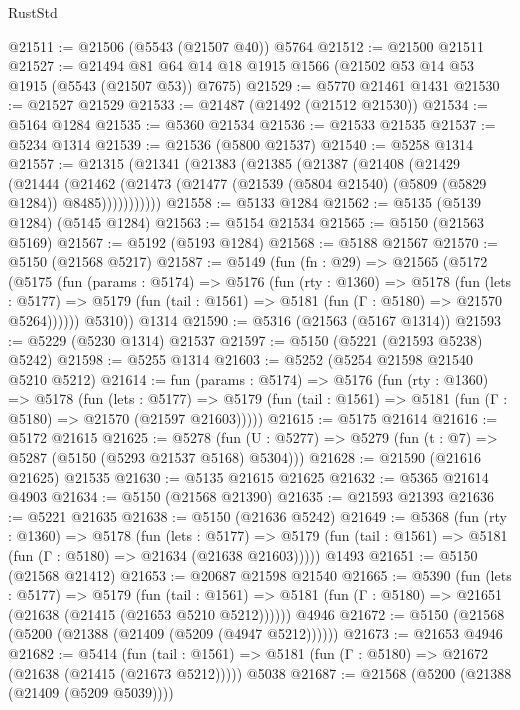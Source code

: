 \begin{lexlean}{RustStd}
\begin{coremodule}
@21511 := @21506 (@5543 (@21507 @40)) @5764
@21512 := @21500 @21511
@21527 := @21494 @81 @64 @14 @18 @1915 @1566 (@21502 @53 @14 @53 @1915 (@5543 (@21507 @53)) @7675)
@21529 := @5770 @21461 @1431
@21530 := @21527 @21529
@21533 := @21487 (@21492 (@21512 @21530))
@21534 := @5164 @1284
@21535 := @5360 @21534
@21536 := @21533 @21535
@21537 := @5234 @1314
@21539 := @21536 (@5800 @21537)
@21540 := @5258 @1314
@21557 := @21315
    (@21341
      (@21383
        (@21385
          (@21387
            (@21408
              (@21429
                (@21444
                  (@21462
                    (@21473 (@21477 (@21539 (@5804 @21540) (@5809 (@5829 @1284)) @8485)))))))))))
@21558 := @5133 @1284
@21562 := @5135 (@5139 @1284) (@5145 @1284)
@21563 := @5154 @21534
@21565 := @5150 (@21563 @5169)
@21567 := @5192 (@5193 @1284)
@21568 := @5188 @21567
@21570 := @5150 (@21568 @5217)
@21587 := @5149
    (fun (fn : @29) =>
    @21565
      (@5172
        (@5175
          (fun (params : @5174) =>
          @5176
            (fun (rty : @1360) =>
            @5178
              (fun (lets : @5177) =>
              @5179 (fun (tail : @1561) => @5181 (fun (Γ : @5180) => @21570 @5264))))))
        @5310))
    @1314
@21590 := @5316 (@21563 (@5167 @1314))
@21593 := @5229 (@5230 @1314) @21537
@21597 := @5150 (@5221 (@21593 @5238) @5242)
@21598 := @5255 @1314
@21603 := @5252 (@5254 @21598 @21540 @5210 @5212)
@21614 := fun (params : @5174) =>
  @5176
    (fun (rty : @1360) =>
    @5178
      (fun (lets : @5177) =>
      @5179 (fun (tail : @1561) => @5181 (fun (Γ : @5180) => @21570 (@21597 @21603)))))
@21615 := @5175 @21614
@21616 := @5172 @21615
@21625 := @5278
    (fun (U : @5277) => @5279 (fun (t : @7) => @5287 (@5150 (@5293 @21537 @5168) @5304)))
@21628 := @21590 (@21616 @21625) @21535
@21630 := @5135 @21615 @21625
@21632 := @5365 @21614 @4903
@21634 := @5150 (@21568 @21390)
@21635 := @21593 @21393
@21636 := @5221 @21635
@21638 := @5150 (@21636 @5242)
@21649 := @5368
    (fun (rty : @1360) =>
    @5178
      (fun (lets : @5177) =>
      @5179 (fun (tail : @1561) => @5181 (fun (Γ : @5180) => @21634 (@21638 @21603)))))
    @1493
@21651 := @5150 (@21568 @21412)
@21653 := @20687 @21598 @21540
@21665 := @5390
    (fun (lets : @5177) =>
    @5179
      (fun (tail : @1561) =>
      @5181 (fun (Γ : @5180) => @21651 (@21638 (@21415 (@21653 @5210 @5212))))))
    @4946
@21672 := @5150 (@21568 (@5200 (@21388 (@21409 (@5209 (@4947 @5212))))))
@21673 := @21653 @4946
@21682 := @5414
    (fun (tail : @1561) => @5181 (fun (Γ : @5180) => @21672 (@21638 (@21415 (@21673 @5212)))))
    @5038
@21687 := @21568 (@5200 (@21388 (@21409 (@5209 @5039))))

\end{coremodule}
\end{lexlean}
